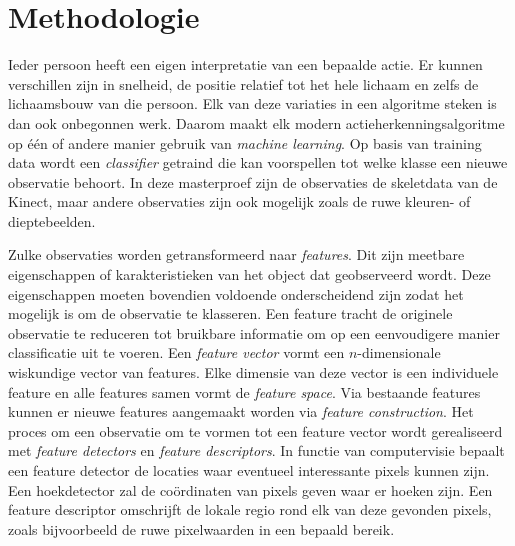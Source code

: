 \chapter{Methodologie}
\label{ch:methodologie}

Ieder persoon heeft een eigen interpretatie van een bepaalde actie. Er kunnen verschillen zijn in snelheid, de positie relatief tot het hele lichaam en zelfs de lichaamsbouw van die persoon. Elk van deze variaties in een algoritme steken is dan ook onbegonnen werk. Daarom maakt elk modern actieherkenningsalgoritme op één of andere manier gebruik van \textit{machine learning}. Op basis van training data wordt een \textit{classifier} getraind die kan voorspellen tot welke klasse een nieuwe observatie behoort. In deze masterproef zijn de observaties de skeletdata van de Kinect, maar andere observaties zijn ook mogelijk zoals de ruwe kleuren- of dieptebeelden.

Zulke observaties worden getransformeerd naar \textit{features}. Dit zijn meetbare eigenschappen of karakteristieken van het object dat geobserveerd wordt. Deze eigenschappen moeten bovendien voldoende onderscheidend zijn zodat het mogelijk is om de observatie te klasseren. Een feature tracht de originele observatie te reduceren tot bruikbare informatie om op een eenvoudigere manier classificatie uit te voeren. Een \textit{feature vector} vormt een $n$-dimensionale wiskundige vector van features. Elke dimensie van deze vector is een individuele feature en alle features samen vormt de \textit{feature space}. Via bestaande features kunnen er nieuwe features aangemaakt worden via \textit{feature construction}. Het proces om een observatie om te vormen tot een feature vector wordt gerealiseerd met \textit{feature detectors} en \textit{feature descriptors}. In functie van computervisie bepaalt een feature detector de locaties waar eventueel interessante pixels kunnen zijn. Een hoekdetector zal de coördinaten van pixels geven waar er hoeken zijn. Een feature descriptor omschrijft de lokale regio rond elk van deze gevonden pixels, zoals bijvoorbeeld de ruwe pixelwaarden in een bepaald bereik.

